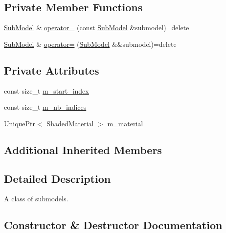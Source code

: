 \subsection*{Private Member Functions}
\begin{DoxyCompactItemize}
\item 
\hyperlink{classmage_1_1_sub_model}{Sub\+Model} \& \hyperlink{classmage_1_1_sub_model_aafc8b4ba509ec78ea36719e98b1a0c99}{operator=} (const \hyperlink{classmage_1_1_sub_model}{Sub\+Model} \&submodel)=delete
\item 
\hyperlink{classmage_1_1_sub_model}{Sub\+Model} \& \hyperlink{classmage_1_1_sub_model_a616b8007e767deebc248485fb8d26773}{operator=} (\hyperlink{classmage_1_1_sub_model}{Sub\+Model} \&\&submodel)=delete
\end{DoxyCompactItemize}
\subsection*{Private Attributes}
\begin{DoxyCompactItemize}
\item 
const size\+\_\+t \hyperlink{classmage_1_1_sub_model_a22db3ac71a33ed64a26bb2e4410eeb28}{m\+\_\+start\+\_\+index}
\item 
const size\+\_\+t \hyperlink{classmage_1_1_sub_model_a0471b8b0c4b7be0e696378238b25e7e7}{m\+\_\+nb\+\_\+indices}
\item 
\hyperlink{namespacemage_a8c307fbcc33bce9b7f2aa4c26c3b95cf}{Unique\+Ptr}$<$ \hyperlink{structmage_1_1_shaded_material}{Shaded\+Material} $>$ \hyperlink{classmage_1_1_sub_model_a162ac42efa17ae49d14ce0fc42c7449c}{m\+\_\+material}
\end{DoxyCompactItemize}
\subsection*{Additional Inherited Members}


\subsection{Detailed Description}
A class of submodels. 

\subsection{Constructor \& Destructor Documentation}
\hypertarget{classmage_1_1_sub_model_a26dce7b076af1edb4209d0a236a250ef}{}\label{classmage_1_1_sub_model_a26dce7b076af1edb4209d0a236a250ef} 
